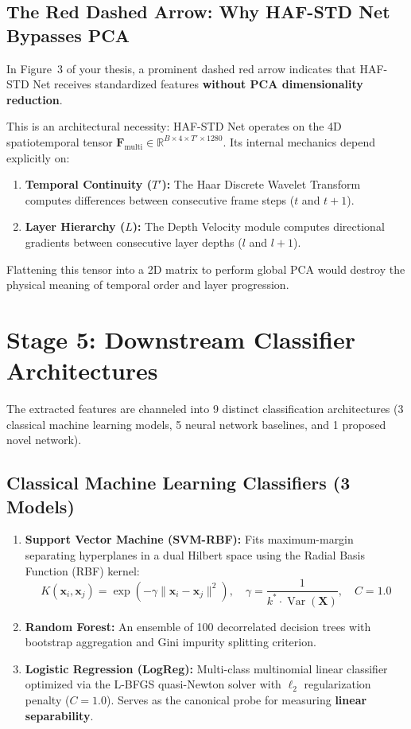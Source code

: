 \documentclass[a4paper, 11pt]{article}
\begin{document}
\subsection{The Red Dashed Arrow: Why HAF-STD Net Bypasses PCA}
In Figure~3 of your thesis, a prominent dashed red arrow indicates that HAF-STD Net receives standardized features \textbf{without PCA dimensionality reduction}. 

This is an architectural necessity: HAF-STD Net operates on the 4D spatiotemporal tensor $\mathbf{F}_{\text{multi}} \in \mathbb{R}^{B \times 4 \times T' \times 1280}$. Its internal mechanics depend explicitly on:
\begin{enumerate}
    \item \textbf{Temporal Continuity ($T'$):} The Haar Discrete Wavelet Transform computes differences between consecutive frame steps ($t$ and $t+1$).
    \item \textbf{Layer Hierarchy ($L$):} The Depth Velocity module computes directional gradients between consecutive layer depths ($l$ and $l+1$).
\end{enumerate}
Flattening this tensor into a 2D matrix to perform global PCA would destroy the physical meaning of temporal order and layer progression.

\section{Stage 5: Downstream Classifier Architectures}

The extracted features are channeled into 9 distinct classification architectures (3 classical machine learning models, 5 neural network baselines, and 1 proposed novel network).

\subsection{Classical Machine Learning Classifiers (3 Models)}
\begin{enumerate}
    \item \textbf{Support Vector Machine (SVM-RBF):} Fits maximum-margin separating hyperplanes in a dual Hilbert space using the Radial Basis Function (RBF) kernel:
    \begin{equation}
        K(\mathbf{x}_i, \mathbf{x}_j) = \exp\left(-\gamma \|\mathbf{x}_i - \mathbf{x}_j\|^2\right), \quad \gamma = \frac{1}{k^* \cdot \operatorname{Var}(\mathbf{X})}, \quad C=1.0
    \end{equation}
    \item \textbf{Random Forest:} An ensemble of 100 decorrelated decision trees with bootstrap aggregation and Gini impurity splitting criterion.
    \item \textbf{Logistic Regression (LogReg):} Multi-class multinomial linear classifier optimized via the L-BFGS quasi-Newton solver with $\ell_2$ regularization penalty ($C=1.0$). Serves as the canonical probe for measuring \textbf{linear separability}.
\end{enumerate}
\end{document}
